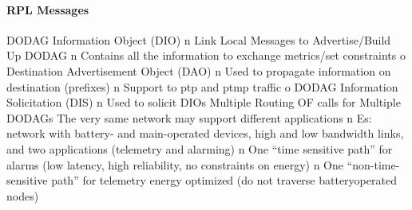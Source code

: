 \paragraph*{RPL Messages}

DODAG Information Object (DIO)
n Link Local Messages to Advertise/Build Up DODAG
n Contains all the information to exchange
metrics/set constraints
o Destination Advertisement Object (DAO)
n Used to propagate information on destination
(prefixes)
n Support to ptp and ptmp traffic
o DODAG Information Solicitation (DIS)
n Used to solicit DIOs
Multiple Routing OF calls for
Multiple DODAGs
The very same network may support different
applications
n Es: network with battery- and main-operated
devices, high and low bandwidth links, and two
applications (telemetry and alarming)
n One “time sensitive path” for alarms (low latency,
high reliability, no constraints on energy)
n One “non-time-sensitive path” for telemetry
energy optimized (do not traverse batteryoperated nodes)